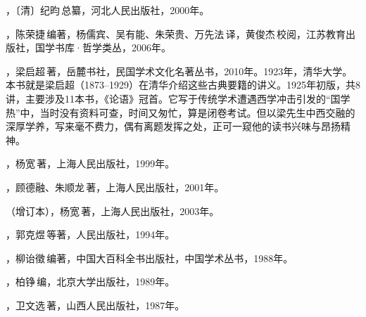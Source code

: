 ，〔清〕纪昀\,总纂，河北人民出版社，2000年。

，陈荣捷\,编著，杨儒宾、吴有能、朱荣贵、万先法\,译，黄俊杰\,校阅，江苏教育出版社，国学书库·哲学类丛，2006年。

，梁启超\,著，岳麓书社，民国学术文化名著丛书，2010年。1923年，清华大学。本书就是梁启超（1873--1929）在清华介绍这些古典要籍的讲义。1925年初版，共8讲，主要涉及11本书，《论语》冠首。它写于传统学术遭遇西学冲击引发的“国学热”中，当时没有资料可查，时间又匆忙，算是闭卷考试。但以梁先生中西交融的深厚学养，写来毫不费力，偶有离题发挥之处，正可一窥他的读书兴味与昂扬精神。

，杨宽\,著，上海人民出版社，1999年。

，顾德融、朱顺龙\,著，上海人民出版社，2001年。

（增订本），杨宽\,著，上海人民出版社，2003年。

，郭克煜\,等著，人民出版社，1994年。

，柳诒徵\,编著，中国大百科全书出版社，中国学术丛书，1988年。

，柏铮\,编，北京大学出版社，1989年。

，卫文选\,著，山西人民出版社，1987年。
